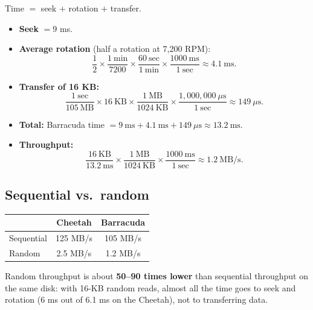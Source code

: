 \documentclass[11pt,a4paper]{article}
\begin{document}
\begin{solbox}
Time \(=\) seek \(+\) rotation \(+\) transfer.
\begin{itemize}
  \item \textbf{Seek} \(= 9\) ms.
  \item \textbf{Average rotation} (half a rotation at 7,200 RPM):
  \[
    \frac12 \times \frac{1\ \text{min}}{7200} \times \frac{60\ \text{sec}}{1\ \text{min}}
    \times \frac{1000\ \text{ms}}{1\ \text{sec}} \approx 4.1\ \text{ms}.
  \]
  \item \textbf{Transfer of 16 KB:}
  \[
    \frac{1\ \text{sec}}{105\ \text{MB}} \times 16\ \text{KB} \times
    \frac{1\ \text{MB}}{1024\ \text{KB}} \times
    \frac{1{,}000{,}000\ \mu\text{s}}{1\ \text{sec}} \approx 149\ \mu\text{s}.
  \]
  \item \textbf{Total:} Barracuda time \(= 9\ \text{ms} + 4.1\ \text{ms} +
        149\ \mu\text{s} \approx 13.2\ \text{ms}\).
  \item \textbf{Throughput:}
  \[
    \frac{16\ \text{KB}}{13.2\ \text{ms}} \times \frac{1\ \text{MB}}{1024\ \text{KB}}
    \times \frac{1000\ \text{ms}}{1\ \text{sec}} \approx 1.2\ \text{MB/s}.
  \]
\end{itemize}
\end{solbox}

\subsection{Sequential vs.\ random}

\begin{center}
\renewcommand{\arraystretch}{1.2}
\begin{tabular}{@{}lcc@{}}
  \toprule
   & \textbf{Cheetah} & \textbf{Barracuda} \\
  \midrule
  Sequential & 125 MB/s & 105 MB/s \\
  Random     & 2.5 MB/s & 1.2 MB/s \\
  \bottomrule
\end{tabular}
\end{center}

\begin{keybox}[Takeaway]
Random throughput is about \textbf{50--90 times lower} than sequential
throughput on the same disk: with 16-KB random reads, almost all the time
goes to seek and rotation (6 ms out of 6.1 ms on the Cheetah), not to
transferring data.
\end{keybox}
\end{document}
